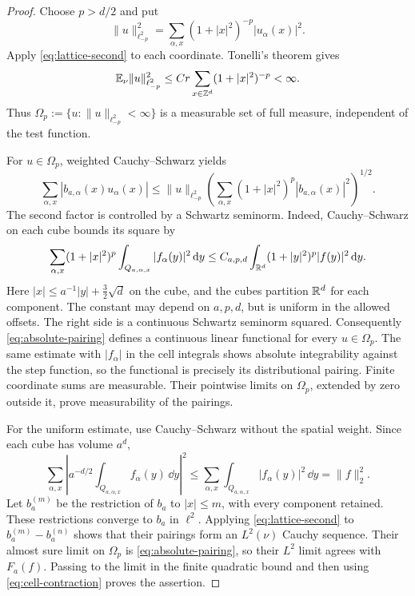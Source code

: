 \begin{proof}
Choose $p>d/2$ and put
\[
 \|u\|_{\ell^2_{-p}}^2
 =\sum_{\alpha,x}(1+|x|^2)^{-p}|u_\alpha(x)|^2.
\]
Apply \eqref{eq:lattice-second} to each coordinate. Tonelli's
theorem gives
\begin{equation}\label{eq:lattice-weighted}
 \mathbb E_\nu\|u\|_{\ell^2_{-p}}^2
 \le Cr\sum_{x\in\mathbb Z^d}(1+|x|^2)^{-p}<\infty.
\end{equation}
Thus $\Omega_p:=\{u:\|u\|_{\ell^2_{-p}}<\infty\}$ is a
measurable set of full measure, independent of the test function.

For $u\in\Omega_p$, weighted Cauchy--Schwarz yields
\begin{equation}\label{eq:weighted-pairing}
 \sum_{\alpha,x}|b_{a,\alpha}(x)u_\alpha(x)|
 \le\|u\|_{\ell^2_{-p}}
 \left(\sum_{\alpha,x}(1+|x|^2)^p
                       |b_{a,\alpha}(x)|^2\right)^{1/2}.
\end{equation}
The second factor is controlled by a Schwartz seminorm. Indeed,
Cauchy--Schwarz on each cube bounds its square by
\[
 \sum_{\alpha,x}(1+|x|^2)^p
             \int_{Q_{a,\alpha,x}}|f_\alpha(y)|^2\,\mathrm d y
 \le C_{a,p,d}\int_{\mathbb R^d}(1+|y|^2)^p|f(y)|^2\,\mathrm d y.
\]
Here $|x|\le a^{-1}|y|+\tfrac32\sqrt d$ on the cube, and
the cubes partition $\mathbb R^d$ for each component. The constant may
depend on $a,p,d$, but is uniform in the allowed offsets.
The right side is a continuous Schwartz seminorm squared.
Consequently \eqref{eq:absolute-pairing} defines a continuous
linear functional for every $u\in\Omega_p$. The same estimate
with $|f_\alpha|$ in the cell integrals shows absolute
integrability against the step function, so the functional is
precisely its distributional pairing. Finite coordinate sums are
measurable. Their pointwise limits on $\Omega_p$, extended by zero
outside it, prove measurability of the pairings.

For the uniform estimate, use Cauchy--Schwarz without the spatial
weight. Since each cube has volume $a^d$,
\begin{equation}\label{eq:cell-contraction}
 \sum_{\alpha,x}\left|a^{-d/2}
               \int_{Q_{a,\alpha,x}}f_\alpha(y)\,\dd y\right|^2
 \le\sum_{\alpha,x}\int_{Q_{a,\alpha,x}}|f_\alpha(y)|^2\,\dd y
 =\|f\|_2^2.
\end{equation}
Let $b_a^{(m)}$ be the restriction of $b_a$ to $|x|\le m$,
with every component retained. These restrictions converge to $b_a$
in $\ell^2$. Applying \eqref{eq:lattice-second} to
$b_a^{(m)}-b_a^{(n)}$ shows that their pairings form an
$L^2(\nu)$ Cauchy sequence. Their almost sure limit on $\Omega_p$
is \eqref{eq:absolute-pairing}, so their $L^2$ limit agrees with
$F_a(f)$. Passing to the limit in the finite quadratic bound and
then using \eqref{eq:cell-contraction} proves the assertion.
\end{proof}

